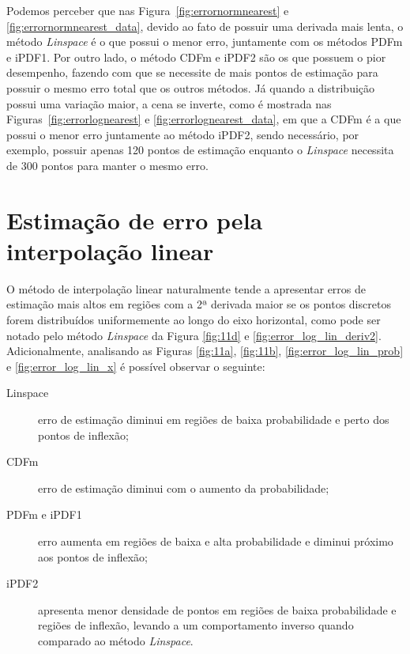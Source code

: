 Podemos perceber que nas Figura~\ref{fig:errornormnearest} e \ref{fig:errornormnearest_data}, devido ao fato de possuir uma derivada mais lenta, o método \textit{Linspace} é o que possui o menor erro, juntamente com os métodos \ac{PDFm} e \ac{iPDF1}. Por outro lado, o método \ac{CDFm} e \ac{iPDF2} são os que possuem o pior desempenho, fazendo com que se necessite de mais pontos de estimação para possuir o mesmo erro total que os outros métodos. Já quando a distribuição possui uma variação maior, a cena se inverte, como é mostrada nas Figuras~\ref{fig:errorlognearest} e  \ref{fig:errorlognearest_data}, em que a \ac{CDFm} é a que possui o menor erro juntamente ao método \ac{iPDF2}, sendo necessário, por exemplo, possuir apenas 120 pontos de estimação enquanto o \textit{Linspace} necessita de 300 pontos para manter o mesmo erro.


\section{Estimação de erro pela interpolação linear} \label{cap:interp_lin}

O método de interpolação linear naturalmente tende a apresentar erros de estimação mais altos em regiões com a 2ª derivada maior se os pontos discretos forem distribuídos uniformemente ao longo do eixo horizontal, como pode ser notado pelo método \textit{Linspace} da Figura \ref{fig:11d} e \ref{fig:error_log_lin_deriv2}. Adicionalmente, analisando as Figuras \ref{fig:11a}, \ref{fig:11b}, \ref{fig:error_log_lin_prob} e \ref{fig:error_log_lin_x} é possível observar o seguinte:

\begin{description}
	\item[Linspace] erro de estimação diminui em regiões de baixa probabilidade e perto dos pontos de inflexão;
	\item[CDFm] erro de estimação diminui com o aumento da probabilidade;%
	\item [PDFm e iPDF1] erro aumenta em regiões de baixa e alta probabilidade e diminui próximo aos pontos de inflexão;
	\item[iPDF2] apresenta menor densidade de pontos em regiões de baixa probabilidade e regiões de inflexão, levando a um comportamento inverso quando comparado ao método \textit{Linspace}.
\end{description}   

